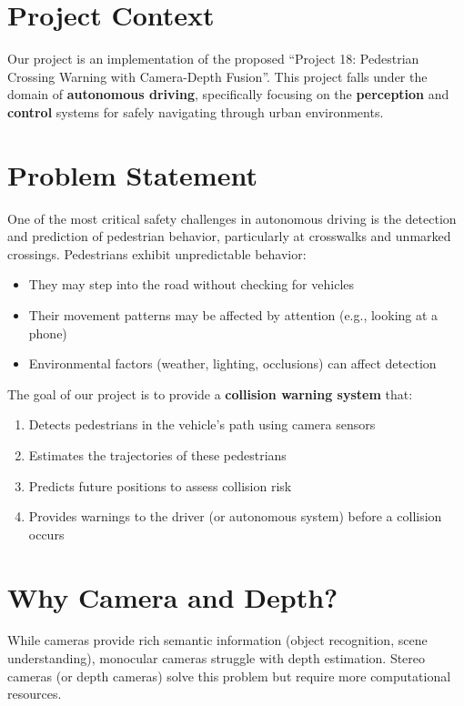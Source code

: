 \section{Project Context}

Our project is an implementation of the proposed ``Project 18: Pedestrian Crossing Warning with Camera-Depth Fusion''. This project falls under the domain of \textbf{autonomous driving}, specifically focusing on the \textbf{perception} and \textbf{control} systems for safely navigating through urban environments.

\section{Problem Statement}

One of the most critical safety challenges in autonomous driving is the detection and prediction of pedestrian behavior, particularly at crosswalks and unmarked crossings. Pedestrians exhibit unpredictable behavior:
\begin{itemize}
    \item They may step into the road without checking for vehicles
    \item Their movement patterns may be affected by attention (e.g., looking at a phone)
    \item Environmental factors (weather, lighting, occlusions) can affect detection
\end{itemize}

The goal of our project is to provide a \textbf{collision warning system} that:
\begin{enumerate}
    \item Detects pedestrians in the vehicle's path using camera sensors
    \item Estimates the trajectories of these pedestrians
    \item Predicts future positions to assess collision risk
    \item Provides warnings to the driver (or autonomous system) before a collision occurs
\end{enumerate}

\section{Why Camera and Depth?}

While cameras provide rich semantic information (object recognition, scene understanding), monocular cameras struggle with depth estimation. Stereo cameras (or depth cameras) solve this problem but require more computational resources.

